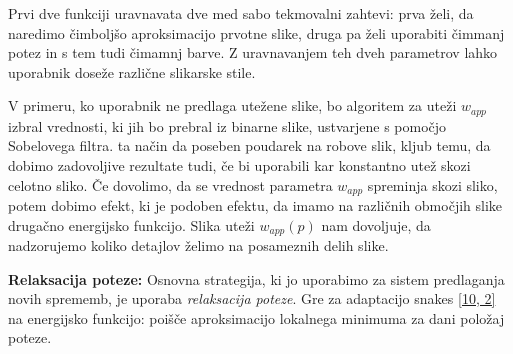 Prvi dve funkciji uravnavata dve med sabo tekmovalni zahtevi: prva želi, da naredimo čimboljšo aproksimacijo prvotne slike, druga pa želi uporabiti čimmanj potez in s tem tudi čimamnj barve. Z uravnavanjem teh dveh parametrov lahko uporabnik doseže različne slikarske stile.

V primeru, ko uporabnik ne predlaga utežene slike, bo algoritem za uteži $w_{app}$ izbral vrednosti, ki jih bo prebral iz binarne slike, ustvarjene s pomočjo Sobelovega filtra. ta način da poseben poudarek na robove slik, kljub temu, da dobimo zadovoljive rezultate tudi, če bi uporabili kar konstantno utež skozi celotno sliko. Če dovolimo, da se vrednost parametra $w_{app}$ spreminja skozi sliko, potem dobimo efekt, ki je podoben efektu, da imamo na različnih območjih slike drugačno energijsko funkcijo. Slika uteži $w_{app}(p)$ nam dovoljuje, da nadzorujemo koliko detajlov želimo na posameznih delih slike.

\textbf{Relaksacija poteze:} Osnovna strategija, ki jo uporabimo za sistem predlaganja novih sprememb, je uporaba \emph{relaksacija poteze}. Gre za adaptacijo snakes \ref{10, 2} na energijsko funkcijo: poišče aproksimacijo lokalnega minimuma za dani položaj poteze.

